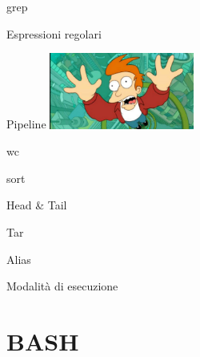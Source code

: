 \documentclass{beamer}
\begin{document}
    \begin{frame}{grep}
    \end{frame}

    \begin{frame}{Espressioni regolari}
    \end{frame}

    \begin{frame}{Pipeline}
        \centering
        \includegraphics[height=2.5cm,keepaspectratio]{images/futurama.png}
    \end{frame}

    \begin{frame}{wc}
    \end{frame}

    \begin{frame}{sort}
    \end{frame}

    \begin{frame}{Head \& Tail}
    \end{frame}

    \begin{frame}{Tar}
    \end{frame}

    \begin{frame}{Alias}
    \end{frame}

    \begin{frame}{Modalità di esecuzione}
    \end{frame}

    \section{BASH}


    
\end{document}
